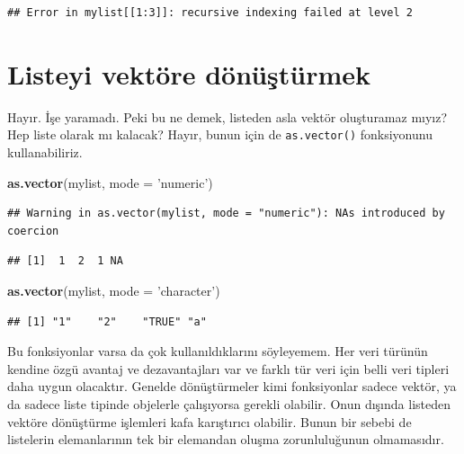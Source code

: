 \documentclass[]{book}
\newenvironment{Shaded}{\begin{snugshade}}{\end{snugshade}}
\newcommand{\DataTypeTok}[1]{\textcolor[rgb]{0.13,0.29,0.53}{#1}}
\newcommand{\KeywordTok}[1]{\textcolor[rgb]{0.13,0.29,0.53}{\textbf{#1}}}
\newcommand{\NormalTok}[1]{#1}
\newcommand{\StringTok}[1]{\textcolor[rgb]{0.31,0.60,0.02}{#1}}
\begin{document}
\begin{verbatim}
## Error in mylist[[1:3]]: recursive indexing failed at level 2
\end{verbatim}

\hypertarget{listeyi-vektore-donusturmek}{%
\section{Listeyi vektöre
dönüştürmek}\label{listeyi-vektore-donusturmek}}

Hayır. İşe yaramadı. Peki bu ne demek, listeden asla vektör oluşturamaz
mıyız? Hep liste olarak mı kalacak? Hayır, bunun için de
\texttt{as.vector()} fonksiyonunu kullanabiliriz.

\begin{Shaded}
\begin{Highlighting}[]
\KeywordTok{as.vector}\NormalTok{(mylist, }\DataTypeTok{mode =} \StringTok{'numeric'}\NormalTok{)}
\end{Highlighting}
\end{Shaded}

\begin{verbatim}
## Warning in as.vector(mylist, mode = "numeric"): NAs introduced by coercion
\end{verbatim}

\begin{verbatim}
## [1]  1  2  1 NA
\end{verbatim}

\begin{Shaded}
\begin{Highlighting}[]
\KeywordTok{as.vector}\NormalTok{(mylist, }\DataTypeTok{mode =} \StringTok{'character'}\NormalTok{)}
\end{Highlighting}
\end{Shaded}

\begin{verbatim}
## [1] "1"    "2"    "TRUE" "a"
\end{verbatim}

Bu fonksiyonlar varsa da çok kullanıldıklarını söyleyemem. Her veri
türünün kendine özgü avantaj ve dezavantajları var ve farklı tür veri
için belli veri tipleri daha uygun olacaktır. Genelde dönüştürmeler kimi
fonksiyonlar sadece vektör, ya da sadece liste tipinde objelerle
çalışıyorsa gerekli olabilir. Onun dışında listeden vektöre dönüştürme
işlemleri kafa karıştırıcı olabilir. Bunun bir sebebi de listelerin
elemanlarının tek bir elemandan oluşma zorunluluğunun olmamasıdır.
\end{document}
